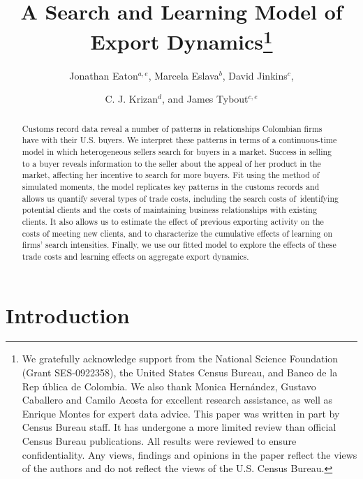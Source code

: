 \documentclass[12pt]{article}
\begin{document}
\title{A Search and Learning Model of Export Dynamics\thanks{%
We gratefully acknowledge support from the National Science Foundation
(Grant SES-0922358), the United States Census Bureau, and Banco de la Rep%
\'{u}blica de Colombia. We also thank Monica Hern\'{a}ndez, Gustavo
Caballero and Camilo Acosta for excellent research assistance, as well as
Enrique Montes for expert data advice. This paper was written in part by
Census Bureau staff. It has undergone a more limited review than official
Census Bureau publications. All results were reviewed to ensure
confidentiality. Any views, findings and opinions in the paper reflect the
views of the authors and do not reflect the views of the U.S. Census Bureau.}%
\\
}
\author{Jonathan Eaton$^{a,e}$, Marcela Eslava$^{b}$, David Jinkins$^{c}$,
\and C. J. Krizan$^{d}$, and James Tybout$^{c,e}$}
\maketitle

\begin{abstract}
Customs record data reveal a number of patterns in relationships Colombian
firms have with their U.S. buyers. We interpret these patterns in terms of a
continuous-time model in which heterogeneous sellers search for buyers in a
market. Success in selling to a buyer reveals information to the seller
about the appeal of her product in the market, affecting her incentive to
search for more buyers. Fit using the method of simulated moments, the model
replicates key patterns in the customs records and allows us quantify
several types of trade costs, including the search costs of\ identifying
potential clients and the costs of maintaining business relationships with
existing clients. It also allows us to estimate the effect of previous
exporting activity on the costs of meeting new clients, and to characterize
the cumulative effects of learning on firms' search intensities. Finally, we
use our fitted model to explore the effects of these trade costs and
learning effects on aggregate export dynamics.
\end{abstract}



\thispagestyle{empty}


\newpage

\section{Introduction}
\end{document}
